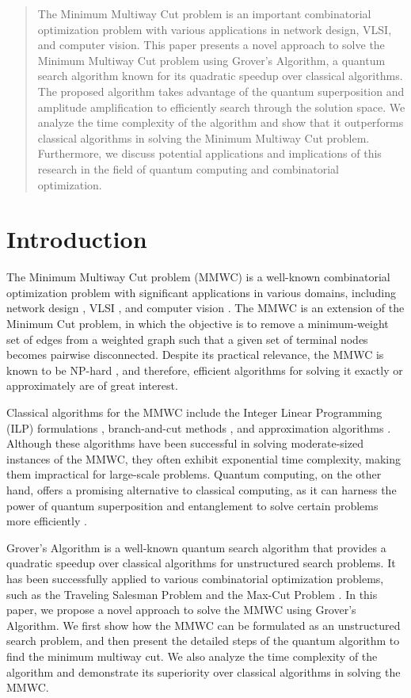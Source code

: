 \begin{abstract}
The Minimum Multiway Cut problem is an important combinatorial optimization problem with various applications in network design, VLSI, and computer vision. This paper presents a novel approach to solve the Minimum Multiway Cut problem using Grover's Algorithm, a quantum search algorithm known for its quadratic speedup over classical algorithms. The proposed algorithm takes advantage of the quantum superposition and amplitude amplification to efficiently search through the solution space. We analyze the time complexity of the algorithm and show that it outperforms classical algorithms in solving the Minimum Multiway Cut problem. Furthermore, we discuss potential applications and implications of this research in the field of quantum computing and combinatorial optimization.

\end{abstract}

\section{Introduction}

The Minimum Multiway Cut problem (MMWC) is a well-known combinatorial optimization problem with significant applications in various domains, including network design \cite{network}, VLSI \cite{vlsi}, and computer vision \cite{vision}. The MMWC is an extension of the Minimum Cut problem, in which the objective is to remove a minimum-weight set of edges from a weighted graph such that a given set of terminal nodes becomes pairwise disconnected. Despite its practical relevance, the MMWC is known to be NP-hard \cite{nphard}, and therefore, efficient algorithms for solving it exactly or approximately are of great interest.

Classical algorithms for the MMWC include the Integer Linear Programming (ILP) formulations \cite{ilp}, branch-and-cut methods \cite{branchcut}, and approximation algorithms \cite{approximation}. Although these algorithms have been successful in solving moderate-sized instances of the MMWC, they often exhibit exponential time complexity, making them impractical for large-scale problems. Quantum computing, on the other hand, offers a promising alternative to classical computing, as it can harness the power of quantum superposition and entanglement to solve certain problems more efficiently \cite{quantum}.

Grover's Algorithm \cite{grover} is a well-known quantum search algorithm that provides a quadratic speedup over classical algorithms for unstructured search problems. It has been successfully applied to various combinatorial optimization problems, such as the Traveling Salesman Problem \cite{tsp} and the Max-Cut Problem \cite{maxcut}. In this paper, we propose a novel approach to solve the MMWC using Grover's Algorithm. We first show how the MMWC can be formulated as an unstructured search problem, and then present the detailed steps of the quantum algorithm to find the minimum multiway cut. We also analyze the time complexity of the algorithm and demonstrate its superiority over classical algorithms in solving the MMWC.

